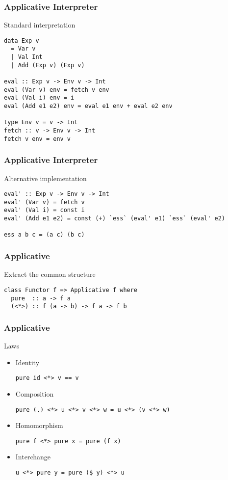 \documentclass{beamer}
\begin{document}
\begin{frame}[fragile]
  \frametitle{Applicative Interpreter}
  \begin{block}{Standard interpretation}
\begin{lstlisting}
data Exp v
  = Var v
  | Val Int
  | Add (Exp v) (Exp v)

eval :: Exp v -> Env v -> Int
eval (Var v) env = fetch v env
eval (Val i) env = i
eval (Add e1 e2) env = eval e1 env + eval e2 env

type Env v = v -> Int
fetch :: v -> Env v -> Int
fetch v env = env v
\end{lstlisting} 
\end{block}
\end{frame}


\begin{frame}[fragile]
  \frametitle{Applicative Interpreter}
  \begin{alertblock}{Alternative implementation}
\begin{lstlisting}
eval' :: Exp v -> Env v -> Int
eval' (Var v) = fetch v
eval' (Val i) = const i
eval' (Add e1 e2) = const (+) `ess` (eval' e1) `ess` (eval' e2)

ess a b c = (a c) (b c)
\end{lstlisting} 
\end{alertblock}
\end{frame}

\begin{frame}[fragile]
  \frametitle{Applicative}
\begin{exampleblock}{Extract the common structure}
\begin{lstlisting}
class Functor f => Applicative f where
  pure  :: a -> f a
  (<*>) :: f (a -> b) -> f a -> f b
\end{lstlisting} 
\end{exampleblock}
\end{frame}            

\begin{frame}[fragile]
  \frametitle{Applicative}
  \begin{block}{Laws}
  \begin{itemize}       
  \item Identity
\begin{lstlisting}
pure id <*> v == v
\end{lstlisting}
  \item Composition
\begin{lstlisting}
pure (.) <*> u <*> v <*> w = u <*> (v <*> w)
\end{lstlisting}
  \item Homomorphism
\begin{lstlisting}
pure f <*> pure x = pure (f x)
\end{lstlisting}
  \item Interchange
\begin{lstlisting}
u <*> pure y = pure ($ y) <*> u
\end{lstlisting}
  \end{itemize} 
  \end{block}   
\end{frame}
\end{document}
